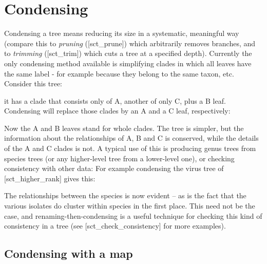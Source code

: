 
\section[sct_condense]{Condensing}


Condensing a tree means reducing its size in a systematic, meaningful way
(compare this to {\em pruning} (\in{}[sct_prune]) which arbitrarily removes
branches, and to {\em trimming} (\in{}[sct_trim]) which cuts a tree at a
specified depth). Currently the only condensing method available is
simplifying clades in which all leaves have the same label - for example
because they belong to the same taxon, etc. Consider this tree:


it has a clade that consists only of A, another of only C, plus a B
leaf.  Condensing will replace those clades by an A and a C leaf,
respectively:


Now the A and B leaves stand for whole clades. The tree is simpler,
but the information about the relationships of A, B and C is conserved, while
the details of the A and C clades is not.  A typical use of this is producing
genus trees from species trees (or any higher-level tree from a lower-level
one), or checking consistency with other data: For example condensing the virus
tree of [sct_higher_rank] gives this:


The relationships between the species is now evident -- as is the
fact that the various isolates do cluster within species in the first place.
This need not be the case, and renaming-then-condensing is a useful technique
for checking this kind of consistency in a tree (see
\in{}[sct_check_consistency] for more examples).

\subsection[sct:condense:map]{Condensing with a map}
